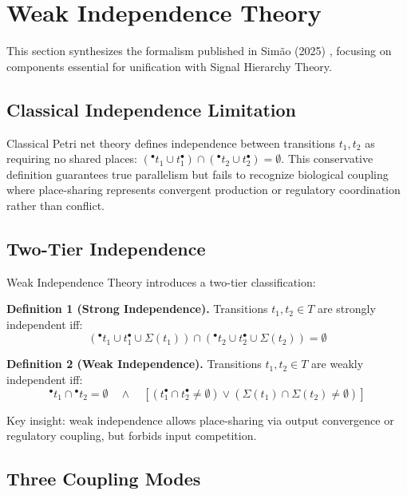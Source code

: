 \documentclass[twocolumn,11pt]{article}
\newcommand{\preset}[1]{\ensuremath{{}^{\bullet}#1}}
\newcommand{\postset}[1]{\ensuremath{#1^{\bullet}}}
\newcommand{\RegSet}[1]{\ensuremath{\Sigma(#1)}}
\begin{document}
\section{Weak Independence Theory}

This section synthesizes the formalism published in Simão (2025) \cite{Simao2025}, focusing on components essential for unification with Signal Hierarchy Theory.

\subsection{Classical Independence Limitation}

Classical Petri net theory defines independence between transitions $t_1, t_2$ as requiring no shared places: $(\preset{t_1} \cup \postset{t_1}) \cap (\preset{t_2} \cup \postset{t_2}) = \emptyset$. This conservative definition guarantees true parallelism but fails to recognize biological coupling where place-sharing represents convergent production or regulatory coordination rather than conflict.

\subsection{Two-Tier Independence}

Weak Independence Theory introduces a two-tier classification:

\textbf{Definition 1 (Strong Independence).} Transitions $t_1, t_2 \in T$ are strongly independent iff:
\begin{equation}
(\preset{t_1} \cup \postset{t_1} \cup \RegSet{t_1}) \cap (\preset{t_2} \cup \postset{t_2} \cup \RegSet{t_2}) = \emptyset
\end{equation}

\textbf{Definition 2 (Weak Independence).} Transitions $t_1, t_2 \in T$ are weakly independent iff:
\begin{equation}
\preset{t_1} \cap \preset{t_2} = \emptyset \quad \land \quad [(\postset{t_1} \cap \postset{t_2} \neq \emptyset) \lor (\RegSet{t_1} \cap \RegSet{t_2} \neq \emptyset)]
\end{equation}

Key insight: weak independence allows place-sharing via output convergence or regulatory coupling, but forbids input competition.

\subsection{Three Coupling Modes}
\end{document}
